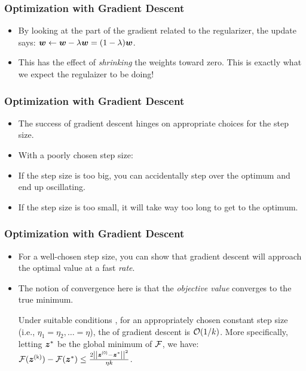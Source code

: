 \documentclass[trans]{beamer}
\begin{document}
\begin{frame}
  \frametitle{Optimization with Gradient Descent}
\begin{itemize}
\item
By looking at the part of the gradient related to the regularizer, the
update says: ${\boldsymbol{w}} \leftarrow {\boldsymbol{w}} - \lambda {\boldsymbol{w}} = (1-\lambda) {\boldsymbol{w}}$.  
\item This has
the effect of \emph{shrinking} the weights toward zero.  This is
exactly what we expect the regulaizer to be doing!
\end{itemize}
\end{frame}

\begin{frame}
  \frametitle{Optimization with Gradient Descent}
\begin{itemize}
\item
The success of gradient descent hinges on appropriate choices for the
step size.
\item With a poorly chosen step size:
\item If the step size is
too big, you can accidentally step over the optimum and end up
oscillating.
\item   If the step size is too small, it will take way too long
to get to the optimum.  
\end{itemize}
\end{frame}

\begin{frame}
  \frametitle{Optimization with Gradient Descent}
\begin{itemize}
\item For a well-chosen step size, you can show that
gradient descent will approach the optimal value at a fast
\emph{rate}.
\item   The notion of convergence here is that the
\emph{objective value} converges to the true minimum.
\begin{theorem} \label{thm:loss:gd}
  Under suitable conditions%
    , for an appropriately chosen
  constant step size (i.e., $\eta_1 = \eta_2, \dots = \eta$), the
   of gradient descent is $\mathcal{O}(1/k)$.  More
  specifically, letting ${\boldsymbol{z}}^*$ be the global minimum of $\mathcal{F}$, we
  have: $\cF(\vz\kth) - \cF(\vz^*) \leq \frac {2
    \norm{\vz\zth-\vz^*}^2} {\eta k}$.
\end{theorem}
\end{itemize}
\end{frame}
\end{document}
